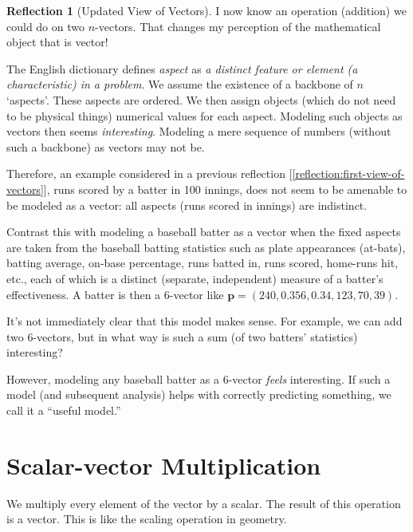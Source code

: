 \documentclass[11pt]{book}
\theoremstyle{definition}
\theoremstyle{plain}
\theoremstyle{problemstyle}
\theoremstyle{remark}
\theoremstyle{definition}
\newtheorem{reflection}{Reflection}
\begin{document}
\begin{reflection}[Updated View of Vectors]
    I now know an operation (addition) we could do on two $n$-vectors. That changes my perception of the mathematical object that is vector! 

    The English dictionary defines \emph{aspect} as \emph{a distinct feature or element (a characteristic) in a problem}. We assume the existence of a backbone of $n$ `aspects'. These aspects are ordered. We then assign objects (which do not need to be physical things) numerical values for each aspect. Modeling such objects as vectors then seems \emph{interesting}. Modeling a mere sequence of numbers (without such a backbone) as vectors may not be.

    Therefore, an example considered in a previous reflection [\ref{reflection:first-view-of-vectors}], runs scored by a batter in 100 innings, does not seem to be amenable to be modeled as a vector: all aspects (runs scored in innings) are indistinct.

    Contrast this with modeling a baseball batter as a vector when the fixed aspects are taken from the baseball batting statistics such as plate appearances (at-bats), batting average, on-base percentage, runs batted in, runs scored, home-runs hit, etc., each of which is a distinct (separate, independent) measure of a batter's effectiveness. A batter is then a $6$-vector like $\boldsymbol{p}=(240,0.356,0.34,123,70,39)$.

    It's not immediately clear that this model makes sense. For example, we can add two $6$-vectors, but in what way is such a sum (of two batters' statistics) interesting? 

    However, modeling any baseball batter as a $6$-vector \emph{feels} interesting. If such a model (and subsequent analysis) helps with correctly predicting something, we call it a ``useful model.''
\end{reflection}

\section{Scalar-vector Multiplication}
\label{s:scalar-vector-multiplication}

We multiply every element of the vector by a scalar. The result of this operation is a vector. This is like the scaling operation in geometry.
\end{document}
